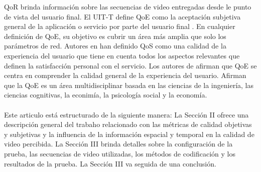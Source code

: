 \documentclass[conference]{IEEEtran}
\begin{document}
    QoR brinda información sobre las secuencias de video entregadas desde le punto de 
    vista del usuario final. El UIT-T define QoE como la aceptación subjetiva general de la 
    aplicación o servicio por parte del usuario final \cite{biblio3}. En cualquier definición de QoE, su 
    objetivo es cubrir un área más amplia que solo los parámetros de red. Autores en \cite{biblio4,biblio5}
    han definido QoS como una calidad de la experiencia del usuario que tiene en 
    cuenta todos los aspectos relevantes que definen la satisfacción personal con el 
    servicio. Los autores de \cite{biblio6} afirman que QoE se centra en comprender la calidad 
    general de la experiencia del usuario. Afirman que la QoE es un área multidisciplinar 
    basada en las ciencias de la ingeniería, las ciencias cognitivas, la econimía, la 
    psicología social y la economía.\\
    \\
    Este articulo está estructurado de la siguiente manera: La Sección II ofrece una descripción 
    general del trabaho relacionado con las métricas de calidad objetivas y subjetivas y la influencia de 
    la información espacial y temporal en la calidad de video percibida. La Sección III brinda detalles 
    sobre la configuración de la prueba, las secuencias de video utilizadas, los métodos de codificación 
    y los resultados de la prueba. La Sección III va seguida de una conclusión.
\end{document}
